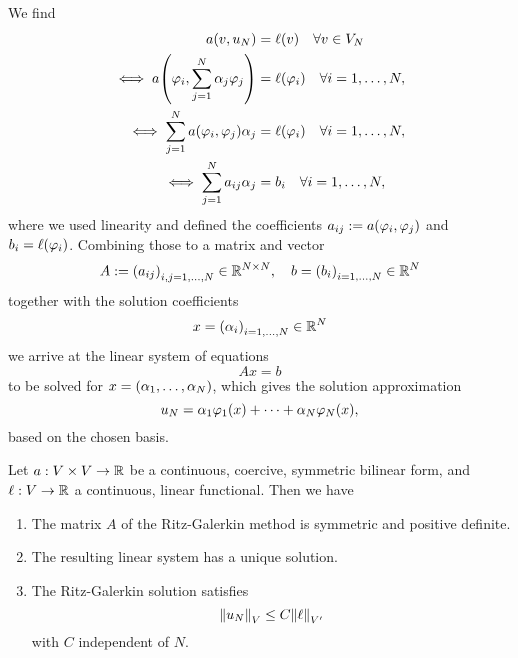 We find
\begin{align*}
    a\parentheses*{v, u_N} &= \ell\parentheses*{v} \quad \forall v \in V_N\\
    \iff a\parentheses*{\varphi_i, \sum_{j = 1}^N \alpha_j \varphi_j} &= \ell\parentheses*{\varphi_i} \quad \forall i = 1, \ldots, N,\\
    \iff \sum_{j = 1}^N a\parentheses*{\varphi_i, \varphi_j}\alpha_j &= \ell\parentheses*{\varphi_i} \quad \forall i = 1, \ldots, N,\\
    \iff \sum_{j = 1}^N a_{ij}\alpha_j &= b_i \quad \forall i = 1, \ldots, N,
\end{align*}
where we used linearity and defined the coefficients \(a_{ij} := a\parentheses*{\varphi_i, \varphi_j}\) and \(b_i = \ell\parentheses*{\varphi_i}\).
Combining those to a matrix and vector
\[
    A := \parentheses*{a_{ij}}_{i, j = 1, \ldots, N} \in \R^{N \times N}, \quad b = \parentheses*{b_i}_{i = 1, \ldots, N} \in \R^N
\]
together with the solution coefficients
\[
    x = \parentheses*{\alpha_i}_{i = 1, \ldots, N} \in \R^N
\]
we arrive at the linear system of equations
\[
    Ax = b
\]
to be solved for \(x = \parentheses*{\alpha_1, \ldots, \alpha_N}\), which gives the solution approximation
\[
    u_N = \alpha_1 \varphi_1\parentheses*{x} + \cdots + \alpha_N \varphi_N\parentheses*{x},
\]
based on the chosen basis.

\begin{theorem}
    Let \(a: V \times V \to \R\) be a continuous, coercive, symmetric bilinear form, and \(\ell: V \to \R\) a continuous, linear functional.
    Then we have
    \begin{enumerate}
        \item\label{theorem:4-2:1} The matrix \(A\) of the Ritz-Galerkin method is symmetric and positive definite.
        \item\label{theorem:4-2:2} The resulting linear system has a unique solution.
        \item\label{theorem:4-2:3} The Ritz-Galerkin solution satisfies
        \[
            \norm*{u_N}_V \le C\norm*{\ell}_{V'}
        \]
        with \(C\) independent of \(N\).
    \end{enumerate}
\end{theorem}

